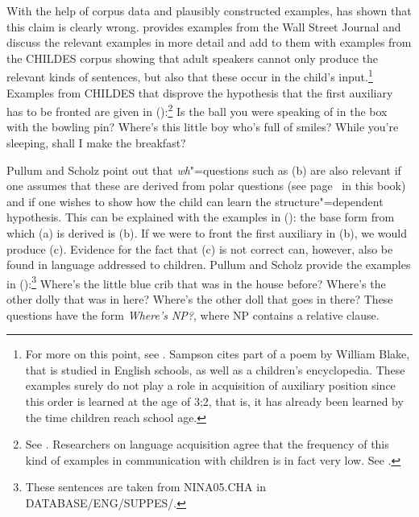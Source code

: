 With the help of corpus data and plausibly constructed examples, \citet{Pullum96a} has shown that this claim is clearly wrong.
 \citet{Pullum96a} provides examples from the Wall Street Journal and \citet{PS2002a} discuss the relevant examples in more detail
 and add to them with examples from the CHILDES corpus showing  that adult speakers cannot only produce the relevant
 kinds of sentences, but also that these occur in the child's input.\footnote{%
For more on this point, see . Sampson cites part of a poem by William Blake, that is studied in English schools, as well as
a children's encyclopedia. These examples surely do not play a role in acquisition of auxiliary position since this order is learned at the age of
3;2, that is, it has already been learned by the time children reach school age.%
}
Examples from CHILDES that disprove the hypothesis that the first auxiliary has to be fronted are given in ():\footnote{%
  See . Researchers on language acquisition agree that the frequency of this kind of examples in communication with children is in fact
  very low. See .
}
\eal
\label{aux-fronting-childes}
\ex Is the ball you were speaking of in the box with the bowling pin?
\ex Where's this little boy who's full of smiles?
\ex\label{aux-fronting-Adjunktsatz} While you're sleeping, shall I make the breakfast?
\zl

\noindent
Pullum and Scholz point out that \emph{wh}"=questions such as (b) are also relevant if one assumes that these are derived from
polar questions (see page~\pageref{Seite-GB-Entscheidungsfragen-Englisch} in this book) and if one wishes to show how the child can
learn the structure"=dependent hypothesis. This can be explained with the examples in (): the
base form from which (a) is derived is (b). If we were to front the first auxiliary in (b), we would produce (c).
\eal
{}
\zl
Evidence for the fact that (c) is not correct can, however, also be found in language addressed to children.
Pullum and Scholz provide the examples in ():\footnote{%
	These sentences are taken from NINA05.CHA in DATABASE/ENG/SUPPES/.
}
\eal
\label{wh-Fragen-Hilfsverbinversion}
\ex Where's the little blue crib that was in the house before?
\ex Where's the other dolly that was in here?
\ex Where's the other doll that goes in there?
\zl
These questions have the form \emph{Where's NP?}, where NP contains a relative clause.

